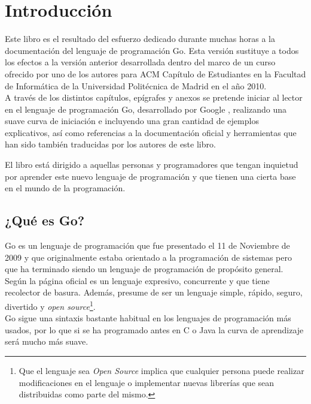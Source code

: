 \chapter{Introducción}

Este libro es el resultado del esfuerzo dedicado durante muchas horas a la
documentación del lenguaje de programación Go. Esta versión sustituye a todos
los efectos a la versión anterior desarrollada dentro del marco de un curso
ofrecido por uno de los autores para ACM Capítulo de Estudiantes en la Facultad de
Informática de la Universidad Politécnica de Madrid en el año 2010.\\

A través de los distintos capítulos, epígrafes y anexos se pretende iniciar al
lector en el lenguaje de programación Go, desarrollado por Google
\texttrademark, realizando una suave curva de iniciación e incluyendo una gran
cantidad de ejemplos explicativos, así como referencias a la documentación
oficial y herramientas que han sido también traducidas por los autores de este
libro.

El libro está dirigido a aquellas personas y programadores que tengan inquietud
por aprender este nuevo lenguaje de programación y que tienen una cierta base en
el mundo de la programación.

\section{¿Qué es Go?}

Go es un lenguaje de programación que fue presentado el 11 de Noviembre de 2009
y que originalmente estaba orientado a la programación de sistemas pero que ha
terminado siendo un lenguaje de programación de propósito general.\\

Según la página oficial \cite{Golang} es un lenguaje
expresivo, concurrente y que tiene recolector de basura. Además, presume de ser un
lenguaje simple, rápido, seguro, divertido y \emph{open
source}\footnote{Que el lenguaje sea \emph{Open Source} implica que cualquier
persona puede realizar modificaciones en el lenguaje o implementar nuevas
librerías que sean distribuidas como parte del mismo.}.\\

Go sigue una sintaxis bastante habitual en los lenguajes de programación más
usados, por lo que si se ha programado antes en C o Java la curva de aprendizaje
será mucho más suave.\\

